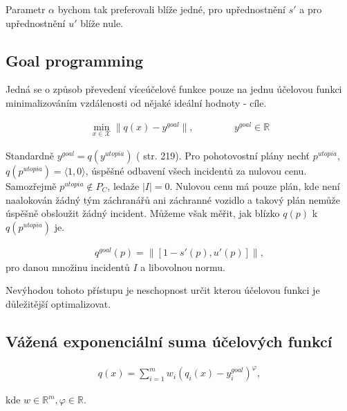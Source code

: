 Parametr $\alpha$ bychom tak preferovali blíže jedné, pro upřednostnění $s'$ a pro upřednostnění $u'$ blíže nule.

\subsection{Goal programming}\label{kap:goalP}

Jedná se o způsob převedení víceúčelové funkce pouze na jednu účelovou funkci minimalizováním vzdálenosti od nějaké ideální hodnoty - cíle. 

\begin{definice}
  \begin{align*}
    \min_{x \in \mathcal{X}} \| q(x) - y^{goal} \|, \hspace{50pt} y^{goal} \in \mathbb{R}
  \end{align*}
\end{definice}

Standardně $y^{goal} = q(y^{utopia})$ (\cite{AlgOptBook} str. 219).
Pro pohotovostní plány nechť $p^{utopia}$, $q(p^{utopia}) = \langle 1, 0 \rangle$, úspěšné odbavení všech incidentů za nulovou cenu.
Samozřejmě $p^{utopia} \not \in P_C$, ledaže $|I| = 0$.
Nulovou cenu má pouze plán, kde není naalokován žádný tým záchranářů ani záchranné vozidlo a takový plán nemůže úspěšně obsloužit žádný incident. 
Můžeme však měřit, jak blízko $q(p)$ k $q(p^{utopia})$ je.

\begin{definice}
  \begin{align*}
    q^{goal}(p) = \| [1 - s'(p), u'(p)] \|,
  \end{align*}
  pro danou množinu incidentů $I$ a libovolnou normu.
\end{definice}

Nevýhodou tohoto přístupu je neschopnost určit kterou účelovou funkci je důležitější optimalizovat.

\subsection{Vážená exponenciální suma účelových funkcí}\label{kap:vazenaSumUcF}

\begin{definice}
  \begin{align*}
    q(x) = \sum_{i=1}^{m} w_i (q_i(x) - y_i^{goal})^\varphi,
  \end{align*}

  kde $w \in \mathbb{R}^m, \varphi \in \mathbb{R}$.
\end{definice}

